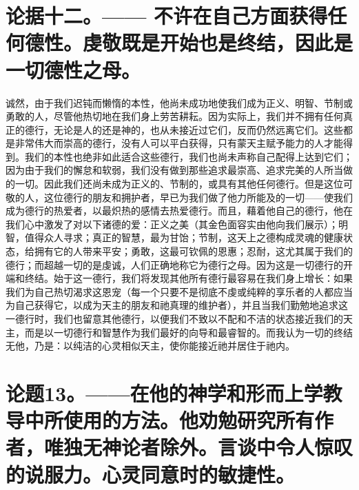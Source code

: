 
\section{论据十二。—— 不许在自己方面获得任何德性。虔敬既是开始也是终结，因此是一切德性之母。}

诚然，由于我们迟钝而懒惰的本性，他尚未成功地使我们成为正义、明智、节制或勇敢的人，尽管他热切地在我们身上劳苦耕耘。因为实际上，我们并不拥有任何真正的德行，无论是人的还是神的，也从未接近过它们，反而仍然远离它们。这些都是非常伟大而崇高的德行，没有人可以平白获得，只有蒙天主赋予能力的人才能得到。我们的本性也绝非如此适合这些德行，我们也尚未声称自己配得上达到它们；因为由于我们的懈怠和软弱，我们没有做到那些追求最崇高、追求完美的人所当做的一切。因此我们还尚未成为正义的、节制的，或具有其他任何德行。但是这位可敬的人，这位德行的朋友和拥护者，早已为我们做了他力所能及的一切——使我们成为德行的热爱者，以最炽热的感情去热爱德行。而且，藉着他自己的德行，他在我们心中激发了对以下诸德的爱：正义之美（其金色面容实由他向我们展示）；明智，值得众人寻求；真正的智慧，最为甘饴；节制，这天上之德构成灵魂的健康状态，给拥有它的人带来平安；勇敢，这最可钦佩的恩惠；忍耐，这尤其属于我们的德行；而超越一切的是虔诚，人们正确地称它为德行之母。因为这是一切德行的开端和终结。始于这一德行，我们将发现其他所有德行最容易在我们身上增长：如果我们为自己热切渴求这恩宠（每一个只要不是彻底不虔或纯粹的享乐者的人都应当为自己获得它，以成为天主的朋友和祂真理的维护者），并且当我们勤勉地追求这一德行时，我们也留意其他德行，以便我们不致以不配和不洁的状态接近我们的天主，而是以一切德行和智慧作为我们最好的向导和最睿智的。而我认为一切的终结无他，乃是：以纯洁的心灵相似天主，使你能接近祂并居住于祂内。\par


\section{论题13。——在他的神学和形而上学教导中所使用的方法。他劝勉研究所有作者，唯独无神论者除外。言谈中令人惊叹的说服力。心灵同意时的敏捷性。}

